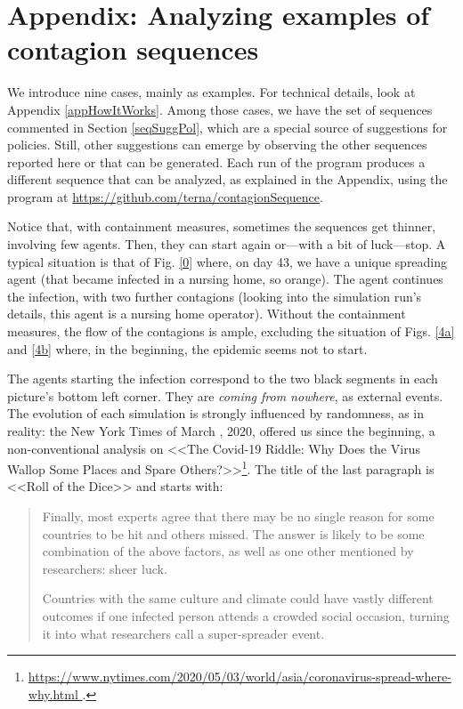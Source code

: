 \documentclass[11pt]{article}
\begin{document}
\appendix

\section{Appendix: Analyzing examples of contagion sequences}
\label{appContagion}

We introduce nine cases, mainly as examples. For technical details, look at Appendix \ref{appHowItWorks}. Among those cases, we have the set of sequences commented in Section \ref{seqSuggPol}, which are a special source of suggestions for policies. Still, other suggestions can emerge by observing the other sequences reported here or that can be generated. Each run of the program produces a different sequence that can be analyzed, as explained in the Appendix, using the program at \url{https://github.com/terna/contagionSequence}.

Notice that, with containment measures, sometimes the sequences get thinner, involving few agents. 
Then, they can start again or---with a bit of luck---stop. A typical situation is that of Fig. \ref{0} where, on day 43, we have a unique spreading agent (that became infected in a nursing home, so orange). The agent continues the infection, with two further contagions (looking into the simulation run's details, this agent is a nursing home operator). Without the containment measures, the flow of the contagions is ample, excluding the situation of Figs. \ref{4a} and \ref{4b} where, in the beginning, the epidemic seems not to start.

The agents starting the infection correspond to the two black segments in each picture's bottom left corner. They are  \emph{coming from nowhere}, as external events. The evolution of each simulation is strongly influenced by randomness, as in reality: the New York Times of March , 2020, offered us since the beginning, a non-conventional analysis on <<The Covid-19 Riddle: Why Does the Virus Wallop Some Places and Spare Others?>>\footnote{\url{https://www.nytimes.com/2020/05/03/world/asia/coronavirus-spread-where-why.html }.}. The title of the last paragraph is <<Roll of the Dice>> and starts with:

\begin{quote}
Finally, most experts agree that there may be no single reason for some countries to be hit and others missed. The answer is likely to be some combination of the above factors, as well as one other mentioned by researchers: sheer luck.

Countries with the same culture and climate could have vastly different outcomes if one infected person attends a crowded social occasion, turning it into what researchers call a super-spreader event.
\end{quote}
\end{document}
